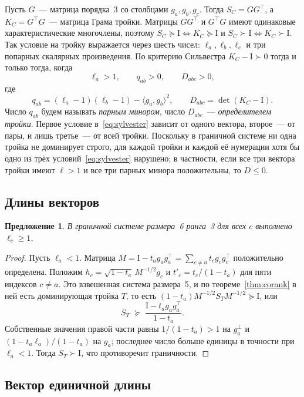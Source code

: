 \documentclass[11pt,a4paper]{article}
\theoremstyle{plain}
\newtheorem{proposition}[theorem]{Предложение}
\theoremstyle{definition}
\theoremstyle{remark}
\newcommand{\Id}{\mathrm{I}}
\newcommand{\T}{^{\!\top}}
\begin{document}
Пусть $G$~--- матрица порядка~3 со столбцами $g_a,g_b,g_c$. Тогда $S_C=GG\T$,
а $K_C=G\T G$~--- матрица Грама тройки. Матрицы $GG\T$ и $G\T G$ имеют
одинаковые характеристические многочлены, поэтому
$S_C\succeq\Id\iff K_C\succeq\Id$ и $S_C\succ\Id\iff K_C\succ\Id$. Так условие
на тройку выражается через шесть чисел: $\ell_a,\ell_b,\ell_c$ и три попарных
скалярных произведения. По критерию Сильвестра $K_C-\Id\succ0$ тогда и только
тогда, когда
\begin{equation}\label{eq:sylvester}
  \ell_a>1,\qquad q_{ab}>0,\qquad D_{abc}>0,
\end{equation}
где
\[
  q_{ab}=(\ell_a-1)(\ell_b-1)-\langle g_a,g_b\rangle^2,\qquad
  D_{abc}=\det(K_C-\Id).
\]
Число $q_{ab}$ будем называть \emph{парным минором}, число $D_{abc}$~---
\emph{определителем тройки}. Первое условие в~\eqref{eq:sylvester} зависит
от одного вектора, второе~--- от пары, и лишь третье~--- от всей тройки.
Поскольку в граничной системе ни одна тройка не доминирует строго, для
каждой тройки и каждой её нумерации хотя бы одно из трёх
условий~\eqref{eq:sylvester} нарушено; в частности, если все три вектора
тройки имеют $\ell>1$ и все три парных минора положительны, то $D\le0$.

\subsection{Длины векторов}

\begin{proposition}\label{prop:long}
В граничной системе размера~6 ранга~3 для всех $c$ выполнено $\ell_c\ge1$.
\end{proposition}
\begin{proof}
Пусть $\ell_a<1$. Матрица $M=\Id-t_ag_ag_a\T=\sum_{c\ne a}t_cg_cg_c\T$
положительно определена. Положим $h_c=\sqrt{1-t_a}\,M^{-1/2}g_c$ и
$t'_c=t_c/(1-t_a)$ для пяти индексов $c\ne a$. Это взвешенная система
размера~5, и по теореме~\ref{thm:corank} в ней есть доминирующая тройка $T$,
то есть $(1-t_a)M^{-1/2}S_TM^{-1/2}\succeq\Id$, или
\begin{equation}\label{eq:funnel}
  S_T\;\succeq\;\frac{\Id-t_ag_ag_a\T}{1-t_a}.
\end{equation}
Собственные значения правой части равны $1/(1-t_a)>1$ на $g_a^\perp$ и
$(1-t_a\ell_a)/(1-t_a)$ на $g_a$; последнее число больше единицы в точности
при $\ell_a<1$. Тогда $S_T\succ\Id$, что противоречит граничности.
\end{proof}

\subsection{Вектор единичной длины}\label{sub:unit}
\end{document}
